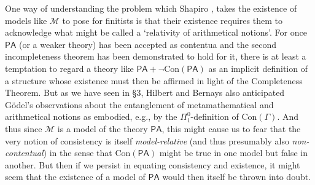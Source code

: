 \documentclass[11pt,fleqn,leqno]{article}
\begin{document}
One way of understanding the problem which Shapiro \citeyearpar[pp. 134-135]{Shapiro1997},  \citeyearpar[pp. 71-74]{Shapiro2005} takes the existence of models like $\mathcal{M}$ to pose for finitists is that their existence requires them to acknowledge what might be called a `relativity of arithmetical notions'.   For once $\mathsf{PA}$ (or a weaker theory) has been accepted as contentua and the second incompleteness theorem has been demonstrated to hold for it, there is at least a temptation to regard a theory like $\mathsf{PA} + \neg \mathrm{Con}(\mathsf{PA})$ as an implicit definition of a structure whose existence must then be affirmed in light of the Completeness Theorem.  But as we have seen in \S 3, Hilbert and Bernays also anticipated G\"odel's observations about the entanglement of metamathematical and arithmetical notions as embodied, e.g., by the $\Pi^0_1$-definition of $\mathrm{Con}(\Gamma)$.   And thus since $\mathcal{M}$ is a model of the theory $\mathsf{PA}$, this might cause us to fear that the very notion of consistency is itself \textsl{model-relative} (and thus presumably also \textsl{non-contentual}) in the sense that $\mathrm{Con}(\mathsf{PA})$ might be true in one model but false in another.   But then if we persist in  equating consistency and existence, it might seem that the existence of a model of $\mathsf{PA}$ would then itself be thrown into doubt.
\end{document}
